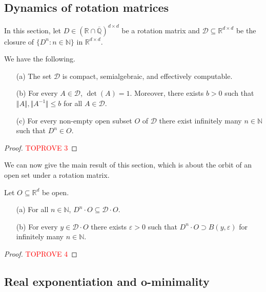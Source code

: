 \documentclass[a4paper,UKenglish,cleveref]{lipics-v2021}
\newcommand{\nat}{\mathbb{N}}
\newcommand{\rel}{\mathbb{R}}
\newcommand{\rat}{\mathbb{Q}}
\newcommand{\alg}{\overline{\rat}}
\newcommand{\ralg}{\rel \cap \alg}
\newcommand{\Dcal}{\mathcal{D}}
\begin{document}
\subsection{Dynamics of rotation matrices}
\label{sec:rotation}

In this section, let $D \in (\ralg)^{d\times d}$ be a rotation matrix and $\Dcal \subseteq \rel^{d\times d}$ be the closure of $\{D^n \colon n\in\nat\}$ in $\rel^{d\times d}$.


\begin{lemma}
	\label{thm:rotation-matrix-closure}
	We have the following.
	\begin{itemize}
		\item[(a)] The set $\Dcal$ is compact, semialgebraic, and effectively computable.
		\item[(b)] For every $A \in \Dcal$, $\det(A) = 1$.
		Moreover, there exists $b >0$ such that $\Vert A \Vert, \Vert A^{-1} \Vert \le b$ for all $A \in \Dcal$.
		\item[(c)] For every non-empty open subset $O$ of $\Dcal$ there exist infinitely many $n \in\nat$ such that $D^n \in O$.
	\end{itemize}
\end{lemma}
\begin{proof}\textcolor{red}{TOPROVE 3}\end{proof}




We can now give the main result of this section, which is about the orbit of an open set under a rotation matrix.

\begin{lemma}
	\label{thm:rotation-with-open sets}
	Let $O \subseteq \rel^d$ be open.
	\begin{itemize}
		\item[(a)] For all $n \in \nat$, $D^n \cdot O \subseteq \Dcal \cdot O$.
		\item[(b)] For every $y \in \Dcal \cdot O$ there exists $\varepsilon>0$ such that $D^n \cdot O \supset B(y, \varepsilon)$ for infinitely many $n \in \nat$.
	\end{itemize}
\end{lemma}
\begin{proof}\textcolor{red}{TOPROVE 4}\end{proof}


\subsection{Real exponentiation and o-minimality}
\label{sec:omin}
\end{document}
